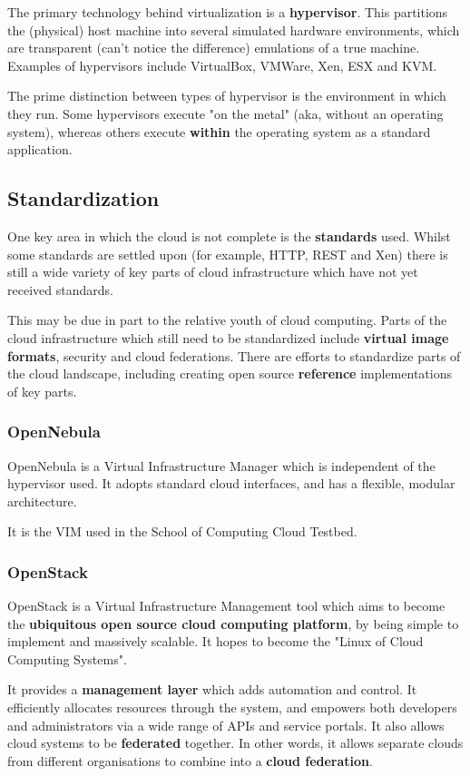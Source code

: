\documentclass{article}
\begin{document}
The primary technology behind virtualization is a \textbf{hypervisor}. This partitions the (physical) host machine into several simulated hardware environments, which are transparent (can't notice the difference) emulations of a true machine. Examples of hypervisors include VirtualBox, VMWare, Xen, ESX and KVM.

The prime distinction between types of hypervisor is the environment in which they run. Some hypervisors execute "on the metal" (aka, without an operating system), whereas others execute \textbf{within} the operating system as a standard application.

\subsection{Standardization}

One key area in which the cloud is not complete is the \textbf{standards} used. Whilst some standards are settled upon (for example, HTTP, REST and Xen) there is still a wide variety of key parts of cloud infrastructure which have not yet received standards.

This may be due in part to the relative youth of cloud computing. Parts of the cloud infrastructure which still need to be standardized include \textbf{virtual image formats}, security and cloud federations. There are efforts to standardize parts of the cloud landscape, including creating open source \textbf{reference} implementations of key parts.
 
\subsubsection{OpenNebula}

OpenNebula is a Virtual Infrastructure Manager which is independent of the hypervisor used. It adopts standard cloud interfaces, and has a flexible, modular architecture. 

It is the VIM used in the School of Computing Cloud Testbed.

\subsubsection{OpenStack}

OpenStack is a Virtual Infrastructure Management tool which aims to become the \textbf{ubiquitous open source cloud computing platform}, by being simple to implement and massively scalable. It hopes to become the "Linux of Cloud Computing Systems". 

It provides a \textbf{management layer} which adds automation and control. It efficiently allocates resources through the system, and empowers both developers and administrators via a wide range of APIs and service portals. It also allows cloud systems to be \textbf{federated} together. In other words, it allows separate clouds from different organisations to combine into a \textbf{cloud federation}.
\end{document}
